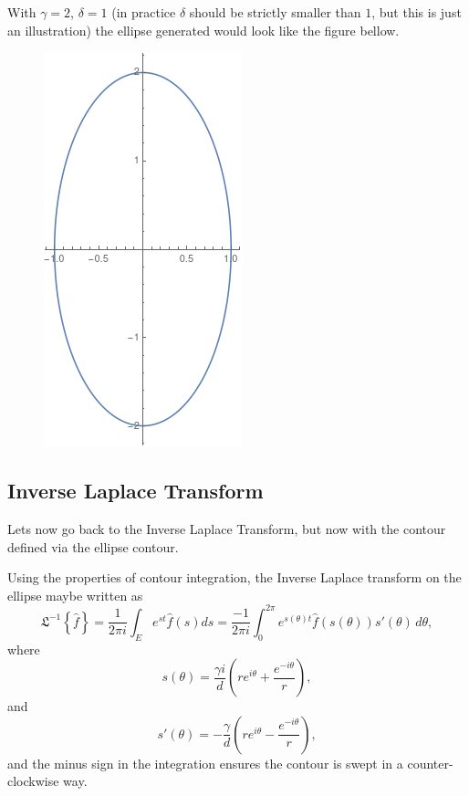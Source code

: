 \documentclass[10pt,a4paper,final]{article}
\begin{document}
With $\gamma=2$, $\delta=1$ (in practice $\delta$ should be strictly smaller than $1$, but this is just an illustration) the ellipse generated would look like the figure bellow. 
\begin{figure}[h!]
\centering
\includegraphics[scale=0.6]{ellipse.png}
\label{fig:ellip2_1}
\end{figure}




\subsection{Inverse Laplace Transform}
Lets now go back to the Inverse Laplace Transform, but now with the contour defined via the ellipse contour. 

Using the properties of contour integration, the Inverse Laplace transform on the ellipse maybe written as
\begin{equation}\label{MILT_ellipse}
{ \mathfrak{ L } }^{ -1 }\left\{ \widehat { f }  \right\}=\frac{1}{2\pi i}\int _{ { E }^{  } }{ { e }^{ st }\widehat { f } \left( s \right) ds }=\frac{-1}{2\pi i}\int_{0}^{2\pi} e^{s(\theta)t}\widehat { f } \left( s(\theta) \right) s'(\theta)\,d\theta,
\end{equation}
where 
\begin{equation}
s(\theta)=\frac{\gamma i}{d}\left(re^{i\theta}+\frac{e^{-i\theta}}{r}\right),
\end{equation}
and
\begin{equation}
s'(\theta)=-\frac{\gamma}{d}\left(re^{i\theta}-\frac{e^{-i\theta}}{r}\right),
\end{equation}
and the minus sign in the integration ensures the contour is swept in a counter-clockwise way.
\end{document}
